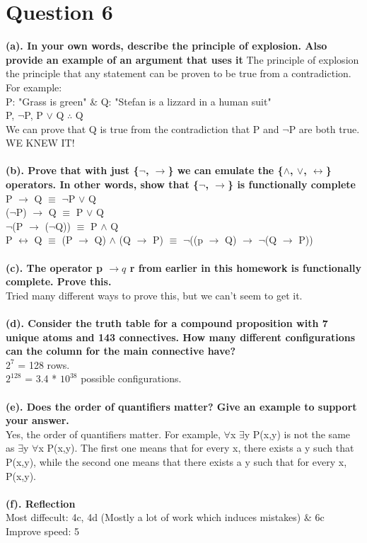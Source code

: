 \documentclass[a4paper]{article}
\begin{document}
\section{Question 6}
\textbf{(a). In your own words, describe the principle of explosion. Also provide an example of an argument that uses it}
The principle of explosion the principle that any statement can be proven to be true from a contradiction. For example:\\
P: "Grass is green" \& Q: "Stefan is a lizzard in a human suit"\\
P, $\neg $P, P $\vee $ Q $\therefore$ Q\\
We can prove that Q is true from the contradiction that P and $\neg $P are both true.\\
WE KNEW IT!
\\\\
\textbf{(b). Prove that with just \{$\neg$, $\rightarrow $\} we can emulate the \{$\wedge$, $\vee $, $\leftrightarrow $\} operators. In other words, show that \{$\neg$, $\rightarrow $\} is functionally complete}\\
P $\rightarrow $ Q $\equiv $ $\neg $P $\vee $ Q\\
($\neg$P) $\rightarrow $ Q $\equiv $ P $\vee $ Q\\
$\neg$(P $\rightarrow $ ($\neg$Q)) $\equiv $ P $\wedge $ Q\\
P $\leftrightarrow $ Q $\equiv $ (P $\rightarrow $ Q) $\wedge $ (Q $\rightarrow $ P) $\equiv $ $\neg$((p $\rightarrow $ Q) $\rightarrow $ $\neg$(Q $\rightarrow $ P))
\\\\
\textbf{(c). The operator p $\rightarrow q$ r from earlier in this homework is functionally complete. Prove this.}\\
Tried many different ways to prove this, but we can't seem to get it.
\\\\
\textbf{(d). Consider the truth table for a compound proposition with 7 unique atoms and 143 connectives. How many different configurations can the column for the main connective have?}\\
\(2^7\) = 128 rows.\\
\(2^128\) = 3.4 * \(10^38\) possible configurations.
\\\\
\textbf{(e). Does the order of quantifiers matter? Give an example to support your answer.}\\
Yes, the order of quantifiers matter. For example, $\forall $x $\exists $y P(x,y) is not the same as $\exists $y $\forall $x P(x,y). The first one means that for every x, there exists a y such that P(x,y), while the second one means that there exists a y such that for every x, P(x,y).
\\\\
\textbf{(f). Reflection}\\
Most diffecult: 4c, 4d (Mostly a lot of work which induces mistakes) \& 6c\\
Improve speed: 5
\end{document}

